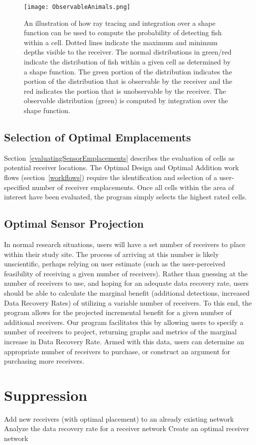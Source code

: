 \begin{figure}[t]
	\label{observableAnimals}
	\centering
	\texttt{[image: ObservableAnimals.png]}
	\caption{An illustration of how ray tracing and integration over a shape function can be used to compute the probability of detecting fish within a cell.  Dotted lines indicate the maximum and minimum depths visible to the receiver.  The normal distributions in green/red indicate the distribution of fish within a given cell as determined by a shape function.  The green portion of the distribution indicates the portion of the distribution that is observable by the receiver and the red indicates the portion that is unobservable by the receiver.  The observable distribution (green) is computed by integration over the shape function.}
\end{figure}


\subsection{Selection of Optimal Emplacements}
Section~\ref{evaluatingSensorEmplacements} describes the evaluation of cells as potential receiver locations.  The Optimal Design and Optimal Addition work flows (section~\ref{workflows}) require the identification and selection of a user-specified number of receiver emplacements.  Once all cells within the area of interest have been evaluated, the program simply selects the highest rated cells.


\subsection{Optimal Sensor Projection}
In normal research situations, users will have a set number of receivers to place within their study site.  The process of arriving at this number is likely unscientific, perhaps relying on user estimate (such as the user-perceived feasibility of receiving a given number of receivers).  Rather than guessing at the number of receivers to use, and hoping for an adequate data recovery rate, users should be able to calculate the marginal benefit (additional detections, increased Data Recovery Rates) of utilizing a variable number of receivers.   To this end, the program allows for the projected incremental benefit for a given number of additional receivers.  Our program facilitates this by allowing users to specify a number of receivers to project, returning graphs and metrics of the marginal increase in Data Recovery Rate.  Armed with this data, users can determine an appropriate number of receivers to purchase, or construct an argument for purchasing more receivers.




\section{Suppression}
\label{suppression}

Add new receivers (with optimal placement) to an already existing network
Analyze the data recovery rate for a receiver network
Create an optimal receiver network

